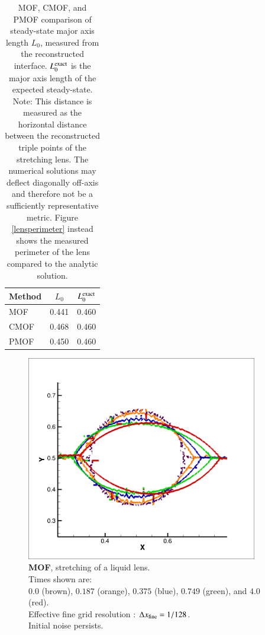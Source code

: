 \documentclass[preprint,12pt]{Definitions/elsarticle}
\newcommand{\tn}{\textnormal}
\begin{document}
\begin{table}[h!]
	\centering
	\caption{MOF, CMOF, and PMOF comparison of steady-state major axis length $L_{0}$, measured from the reconstructed interface. $L^\tn{exact}_{0}$ is the major axis length of the expected steady-state.\\
		Note: This distance is measured as the horizontal distance between the reconstructed triple points of the stretching lens. The numerical solutions may deflect diagonally off-axis and therefore not be a sufficiently representative metric. Figure \ref{lensperimeter} instead shows the measured perimeter of the lens compared to the analytic solution.
	}
	\renewcommand{\arraystretch}{1.2} 
	\begin{tabular}{|l|c|c|}
		\hline
		Method & $L_{0}$ & $L_{0}^\tn{exact}$  \\ \hline
		MOF    & 0.441  & 0.460   \\ \hline
		CMOF   & 0.468  & 0.460  \\ \hline
		PMOF   & 0.450 & 0.460  \\ \hline
	\end{tabular}
	\label{liquidlens_table}
\end{table}

\begin{figure}[H]
	\centering
	\includegraphics[width=0.9\textwidth]{MOF_NOTRUNCATE_LENS.png} 
	\caption{\textbf{MOF}, stretching of a liquid lens.  \\
		Times shown are:\\
		$0.0$ (brown), $0.187$ (orange), 
		$0.375$ (blue), $0.749$ (green), and $4.0$ (red).\\
		Effective fine grid resolution : $\Delta x_\tn{fine}=1/128$.\\
		Initial noise persists.
	}
	\label{MOF_liquid_lens}
\end{figure}
\end{document}
